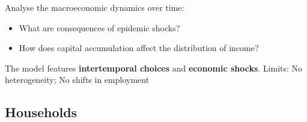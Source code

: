 \begin{tcolorbox}[
    colback=green!5!white, %
    colframe=darkgreen!40!white, %
   title=Motivation, %
    fonttitle=\bfseries %
    ]
    
    Analyse the macroeconomic dynamics over time:
    \begin{itemize}
        \item What are consequences of epidemic shocks?
        \item How does capital accumulation affect the distribution of income? 
    \end{itemize}
    The model features \textbf{intertemporal choices} and \textbf{economic shocks}. Limits: No heterogeneity; No shifts in employment
\end{tcolorbox}


\subsection{Households}
